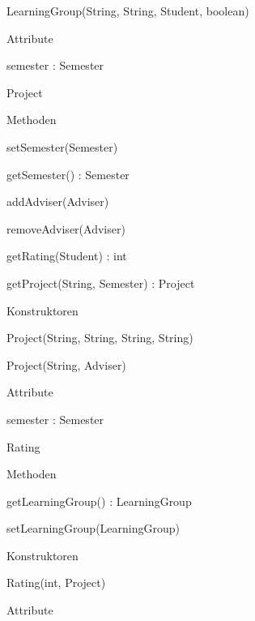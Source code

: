 \documentclass[parskip=full]{scrartcl}
\begin{document}
\begin{itemPackage}
\begin{itemClass}
\begin{itemClassSub}
\begin{itemPlus}
\item LearningGroup(String, String, Student, boolean)
\end{itemPlus}
\item Attribute 
\begin{itemPlus}
\item semester : Semester
\end{itemPlus}
\end{itemClassSub}
\item Project
\begin{itemClassSub}
\item Methoden
\begin{itemPlus}
\item setSemester(Semester)
\item getSemester() : Semester
\item addAdviser(Adviser)
\item removeAdviser(Adviser)
\end{itemPlus}
\begin{itemMinus}
\item getRating(Student) : int
\item getProject(String, Semester) : Project
\end{itemMinus}
\item Konstruktoren
\begin{itemPlus}
\item Project(String, String, String, String)
\item Project(String, Adviser)
\end{itemPlus}
\item Attribute 
\begin{itemPlus}
\item semester : Semester
\end{itemPlus}
\end{itemClassSub}
\item Rating
\begin{itemClassSub}
\item Methoden
\begin{itemPlus}
\item getLearningGroup() : LearningGroup
\item setLearningGroup(LearningGroup)
\end{itemPlus}
\item Konstruktoren
\begin{itemPlus}
\item Rating(int, Project)
\end{itemPlus}
\item Attribute 

\end{itemClassSub}
\end{itemClass}
\end{itemPackage}
\end{document}
